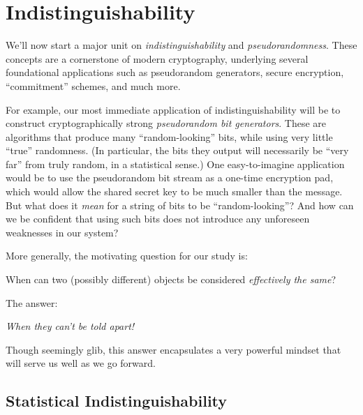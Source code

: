 \documentclass[11pt]{article}
\begin{document}
\thispagestyle{fancy}           %


\section{Indistinguishability}
\label{sec:indistinguishability}

We'll now start a major unit on \emph{indistinguishability} and
\emph{pseudorandomness}.  These concepts are a cornerstone of modern
cryptography, underlying several foundational applications such as
pseudorandom generators, secure encryption, ``commitment'' schemes,
and much more.

For example, our most immediate application of indistinguishability
will be to construct cryptographically strong \emph{pseudorandom bit
  generators}.  These are algorithms that produce many
``random-looking'' bits, while using very little ``true'' randomness.
(In particular, the bits they output will necessarily be ``very far''
from truly random, in a statistical sense.)  One easy-to-imagine
application would be to use the pseudorandom bit stream as a one-time
encryption pad, which would allow the shared secret key to be much
smaller than the message.  But what does it \emph{mean} for a string
of bits to be ``random-looking''?  And how can we be confident that
using such bits does not introduce any unforeseen weaknesses in our
system?

More generally, the motivating question for our study is:
\begin{center}
  When can two (possibly different) objects be considered
  \emph{effectively the same}?
\end{center}
The answer:
\begin{center}
  \emph{When they can't be told apart!}
\end{center}
Though seemingly glib, this answer encapsulates a very powerful
mindset that will serve us well as we go forward.

\subsection{Statistical Indistinguishability}
\label{sec:stat-indist}
\end{document}

